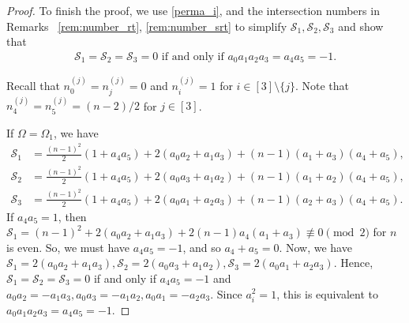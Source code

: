 \documentclass[11pt,oneside]{amsart}
\begin{document}
{\begin{proof}
To finish the proof, we use \eqref{perma_i}, and the intersection numbers in Remarks ~\ref{rem:number_rt},  \ref{rem:number_srt} to
simplify $\mathscr S_1,\mathscr S_2,\mathscr S_3$ and show that 
 \begin{align*}
       \mathscr S_1 =\mathscr S_2=\mathscr S_3=0 \text{ if and only if } a_0a_1a_2a_3=a_4a_5=-1.
    \end{align*}

Recall that $n_0^{(j)}=n_j^{(j)}=0$ and $n_i^{(j)}=1$ for $i\in[3]\setminus \{j\}$.
Note that $n_4^{(j)}=n_5^{(j)}=(n-2)/2$ for $j\in [3]$. 

   If $\Omega=\Omega_1$,  we have     
    \begin{align*}
    \mathscr S_1&=\frac{(n-1)^2}{2}(1+a_4  a_5) + 2 (a_0  a_2  +  a_1  a_3)  +(n-1)(a_1 +a_3)(a_4   +a_5),\\
    \mathscr S_2&=\frac{(n-1)^2}{2}(1+a_4  a_5) + 2 (a_0  a_3  + a_1  a_2)  +(n-1)(a_1 +a_2)(a_4   +a_5),\\
    \mathscr S_3 &=\frac{(n-1)^2}{2}(1+a_4  a_5) + 2 (a_0  a_1  +  a_2  a_3) +(n-1) (a_2 +a_3)(a_4   +a_5).
    \end{align*}
If $a_4 a_5=1$, then $\mathscr S_1=(n-1)^2 + 2 (a_0  a_2  +  a_1  a_3)  +2(n-1)a_4(a_1 +a_3)\not\equiv 0 \pmod 2$ for $n$ is even. So, we must have $a_4 a_5=-1$, and so $a_4+a_5=0$. Now, we have $\mathscr S_1 = 2(a_0 a_2 + a_1 a_3), \mathscr S_2 = 2(a_0 a_3 + a_1 a_2),\mathscr S_3 = 2(a_0 a_1 + a_2 a_3)$. 
Hence, $\mathscr S_1 =\mathscr S_2=\mathscr S_3=0$ if and only if $a_4 a_5=-1$ and 
$a_0 a_2 = -a_1 a_3, a_0 a_3 =- a_1 a_2, a_0 a_1 =- a_2 a_3$.    Since $a_i^2=1$, this is equivalent to $a_0a_1a_2a_3=a_4a_5=-1$.  
    

\end{proof}}
\end{document}
